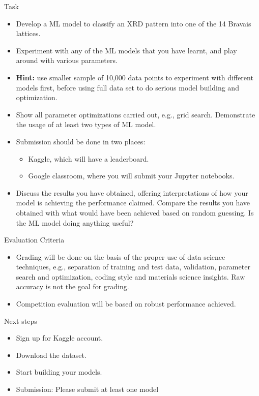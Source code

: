 \documentclass[aspectratio=169]{beamer}
\begin{document}
\begin{frame}{Task}
    \begin{itemize}
        \item Develop a ML model to classify an XRD pattern into one of the 14 Bravais lattices. 
        \item Experiment with any of the ML models that you have learnt, and play around with various parameters. 
        \item \textbf{Hint:} use smaller sample of 10,000 data points to experiment with different models first, before using full data set to do serious model building and optimization. 
        \item Show all parameter optimizations carried out, e.g., grid search. Demonstrate the usage of at least two types of ML model. 
        \item Submission should be done in two places:
        \begin{itemize}
            \item Kaggle, which will have a leaderboard.
            \item Google classroom, where you will submit your Jupyter notebooks.
        \end{itemize}
        \item Discuss the results you have obtained, offering interpretations of how your model is achieving the performance claimed. Compare the results you have obtained with what would have been achieved based on random guessing. Is the ML model doing anything useful?
    \end{itemize}
\end{frame}


\begin{frame}{Evaluation Criteria}
    \begin{itemize}
        \item Grading will be done on the basis of the proper use of data science techniques, e.g., separation of training and test data, validation, parameter search and optimization, coding style and materials science insights. Raw accuracy is not the goal for grading.
        \item Competition evaluation will be based on robust performance achieved.
    \end{itemize}
\end{frame}


\begin{frame}{Next steps}
    \begin{itemize}
        \item Sign up for Kaggle account.
        \item Download the dataset.
        \item Start building your models.
        \item Submission: Please submit at least one model 
    \end{itemize}
\end{frame}
\end{document}
